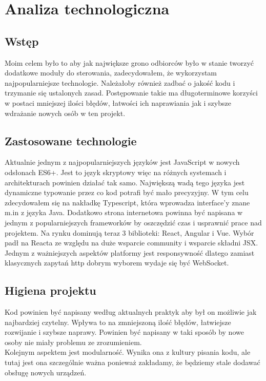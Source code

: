 \chapter{Analiza technologiczna}
\section{Wstęp}
Moim celem było to aby jak największe grono odbiorców było w stanie tworzyć dodatkowe moduły do sterowania, zadecydowałem, że wykorzystam najpopularniejsze technologie. Należałoby również zadbać o jakość kodu i trzymanie się ustalonych zasad. Postępowanie takie ma długoterminowe korzyści w postaci mniejszej ilości błędów, łatwości ich naprawiania jak i szybsze wdrażanie nowych osób w ten projekt.
\section{Zastosowane technologie}
Aktualnie jednym z najpopularniejszych języków jest JavaScript w nowych odsłonach ES6+. Jest to język skryptowy więc na różnych systemach i architekturach powinien działać tak samo. Największą wadą tego języka jest dynamiczne typowanie przez co kod potrafi być mało precyzyjny. W tym celu zdecydowałem się na nakładkę Typescript, która wprowadza interface'y znane m.in z języka Java. Dodatkowo strona internetowa powinna być napisana w jednym z popularniejszych frameworków by oszczędzić czas i usprawnić prace nad projektem. Na rynku dominują teraz 3 biblioteki: React, Angular i Vue. Wybór padł na Reacta ze względu na duże wsparcie community i wsparcie składni JSX. \\
Jednym z ważniejszych aspektów platformy jest responsywność dlatego zamiast klasycznych zapytań http dobrym wyborem wydaje się być WebSocket. 
\section{Higiena projektu}
Kod powinien być napisany według aktualnych praktyk aby był on możliwie jak najbardziej czytelny. Wpływa to na zmniejszoną ilość błędów, łatwiejsze rozwijanie i szybsze naprawy. Powinien być napisany w taki sposób by nowe osoby nie miały problemu ze zrozumieniem. \\
Kolejnym aspektem jest modularność. Wynika ona z kultury pisania kodu, ale tutaj jest ona szczególnie ważna ponieważ zakładamy, że będziemy stale dodawać obsługę nowych urządzeń.